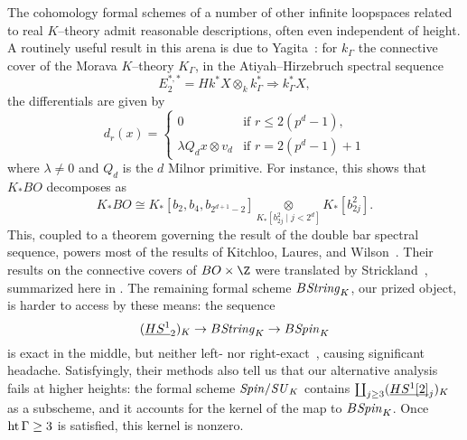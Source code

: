 \begin{remark}
The cohomology formal schemes of a number of other infinite loopspaces related to real \(K\)--theory admit reasonable descriptions, often even independent of height.  A routinely useful result in this arena is due to Yagita~\cite[Lemma 2.1]{Yagita}: for \(k_\Gamma\) the connective cover of the Morava \(K\)--theory \(K_\Gamma\), in the Atiyah--Hirzebruch spectral sequence \[E_2^{*, *} = Hk^* X \otimes_k k_\Gamma^* \Rightarrow k_\Gamma^* X,\] the differentials are given by \[d_r(x) = \begin{cases} 0 & \text{if \(r \le 2(p^d - 1)\)}, \\ \lambda Q_d x \otimes v_d & \text{if \(r = 2(p^d - 1) + 1\)} \end{cases}\] where \(\lambda \ne 0\) and \(Q_d\) is the \(d\){\th} Milnor primitive.  For instance, this shows that \(K_* BO\) decomposes as \[K_* BO \cong K_*[b_2, b_4, b_{2^{d+1}-2}] \underset{K_*[b_{2j}^2 \mid j < 2^d]}{\otimes} K_*[b_{2j}^2].\]  This, coupled to a theorem governing the result of the double bar spectral sequence, powers most of the results of Kitchloo, Laures, and Wilson~\cite[Section 4]{KLW}.  Their results on the connective covers of \(BO \times \Z\) were translated by Strickland~\cite{StricklandFSKS}, summarized here in .  The remaining formal scheme \(B\mathit{String}_K\), our prized object, is harder to access by these means: the sequence \[(\OS{HS^1}{2})_K \to B\String_K \to B\Spin_K\] is exact in the middle, but neither left- nor right-exact~\cite[pg.\ 234]{KLW}, causing significant headache.  Satisfyingly, their methods also tell us that our alternative analysis fails at higher heights: the formal scheme \(\mathit{Spin}/\mathit{SU}_K\) contains \(\coprod_{j \ge 3} (\OS{HS^1[2]}{j})_K\) as a subscheme, and it accounts for the kernel of the map to \(B\mathit{Spin}_K\).  Once \(\operatorname{ht} \Gamma \ge 3\) is satisfied, this kernel is nonzero.
\end{remark}

